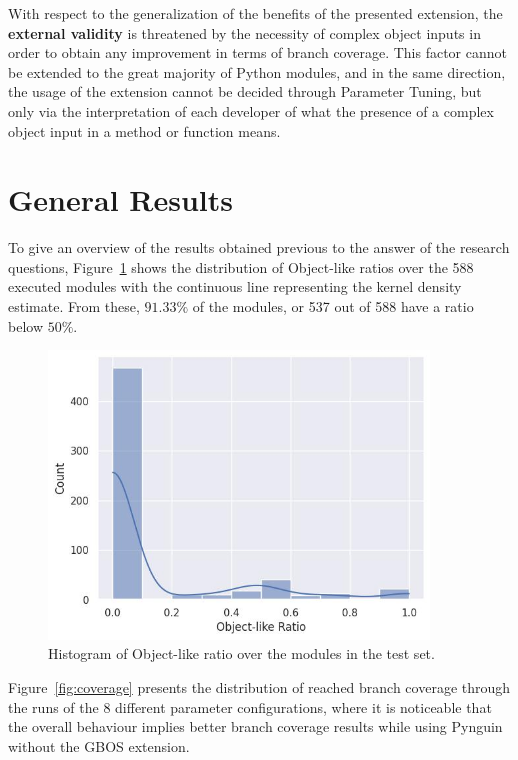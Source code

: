 \documentclass[%
  chapterprefix=false,%
  open=right,%
  twoside=true,%
  paper=a4,%
  logofile={Figures/logo.png},%
  thesistype=master,%
  UKenglish,%
]{se2thesis}
\begin{document}
With respect to the generalization of the benefits of the presented extension, the \textbf{external validity} is threatened by the necessity of complex object inputs in order to obtain any improvement in terms of branch coverage.
This factor cannot be extended to the great majority of Python modules, and in the same direction, the usage of the extension cannot be decided through Parameter Tuning, but only via the interpretation of each developer of what the presence of a complex object input in a method or function means.


\section{General Results}

To give an overview of the results obtained previous to the answer of the research questions, Figure~\ref{fig:olr-hist} shows the distribution of Object-like ratios over the 588 executed modules with the continuous line representing the kernel density estimate.
From these, \(91.33\%\) of the modules, or 537 out of 588 have a ratio below \(50\%\). 

\begin{figure}[bth]
  \centering
  \includegraphics[width=0.9\textwidth]{Figures/Results/olr-hist.jpg}
  \caption{Histogram of Object-like ratio over the modules in the test set.}\label{fig:olr-hist}
\end{figure}

Figure~\ref{fig:coverage} presents the distribution of reached branch coverage through the runs of the 8 different parameter configurations, where it is noticeable that the overall behaviour implies better branch coverage results while using Pynguin without the GBOS extension.
\end{document}
